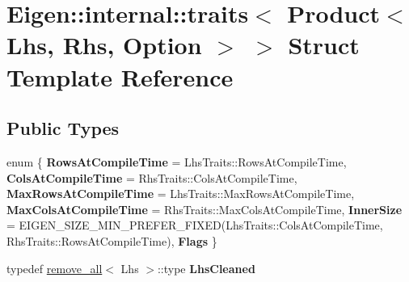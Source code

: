 \hypertarget{struct_eigen_1_1internal_1_1traits_3_01_product_3_01_lhs_00_01_rhs_00_01_option_01_4_01_4}{}\section{Eigen\+::internal\+::traits$<$ Product$<$ Lhs, Rhs, Option $>$ $>$ Struct Template Reference}
\label{struct_eigen_1_1internal_1_1traits_3_01_product_3_01_lhs_00_01_rhs_00_01_option_01_4_01_4}
\subsection*{Public Types}
\begin{DoxyCompactItemize}
\item 
\mbox{\label{struct_eigen_1_1internal_1_1traits_3_01_product_3_01_lhs_00_01_rhs_00_01_option_01_4_01_4_a70b57caa359c4c02ec3d390ed084945b}} 
enum \{ \newline
{\bfseries Rows\+At\+Compile\+Time} = Lhs\+Traits\+::Rows\+At\+Compile\+Time, 
{\bfseries Cols\+At\+Compile\+Time} = Rhs\+Traits\+::Cols\+At\+Compile\+Time, 
{\bfseries Max\+Rows\+At\+Compile\+Time} = Lhs\+Traits\+::Max\+Rows\+At\+Compile\+Time, 
{\bfseries Max\+Cols\+At\+Compile\+Time} = Rhs\+Traits\+::Max\+Cols\+At\+Compile\+Time, 
\newline
{\bfseries Inner\+Size} = E\+I\+G\+E\+N\+\_\+\+S\+I\+Z\+E\+\_\+\+M\+I\+N\+\_\+\+P\+R\+E\+F\+E\+R\+\_\+\+F\+I\+X\+ED(Lhs\+Traits\+::Cols\+At\+Compile\+Time, Rhs\+Traits\+::Rows\+At\+Compile\+Time), 
{\bfseries Flags}
 \}
\item 
\mbox{\label{struct_eigen_1_1internal_1_1traits_3_01_product_3_01_lhs_00_01_rhs_00_01_option_01_4_01_4_a6fd76e36f8afc58da6d2d5646b671807}} 
typedef \mbox{\hyperlink{struct_eigen_1_1internal_1_1remove__all}{remove\+\_\+all}}$<$ Lhs $>$\+::type {\bfseries Lhs\+Cleaned}
\item 
\mbox{\label{struct_eigen_1_1internal_1_1traits_3_01_product_3_01_lhs_00_01_rhs_00_01_option_01_4_01_4_a6fd90d8da68fa0e0877534a52aa0ad62}} 

\end{DoxyCompactItemize}
